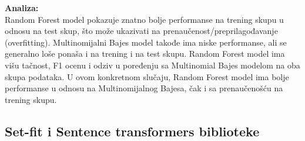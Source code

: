 \documentclass{article}
\begin{document}
\begin{flushleft}
\begin{center}
\end{center}


\textbf{Analiza:\\}
Random Forest model pokazuje znatno bolje performanse na trening skupu u odnosu na test skup, što može ukazivati na prenaučenost/preprilagođavanje (overfitting).
Multinomijalni Bajes model takođe ima niske performanse, ali se generalno loše ponaša i na trening i na test skupu.
Random Forest model ima višu tačnost, F1 ocenu i odziv u poređenju sa Multinomial Bajes modelom na oba skupa podataka. U ovom konkretnom slučaju, Random Forest model ima bolje performanse u odnosu na Multinomijalnog Bajesa, čak i sa prenaučenošću na trening skupu.



\end{flushleft}


\newpage



\subsection{Set-fit i Sentence transformers biblioteke}
\end{document}
